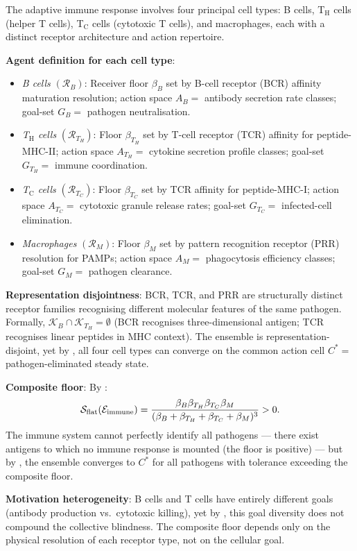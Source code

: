 \begin{example}
\label{ex:immune-response}
The adaptive immune response involves four principal cell types:
B cells, T$_{\mathrm{H}}$ cells (helper T cells), T$_{\mathrm{C}}$ cells
(cytotoxic T cells), and macrophages, each with a distinct receptor
architecture and action repertoire.

\textbf{Agent definition for each cell type}:
\begin{itemize}[leftmargin=2em]
  \item \textit{B cells} $(\mathcal{R}_B)$: Receiver floor $\beta_B$ set by
    B-cell receptor (BCR) affinity maturation resolution; action space $A_B
    =$ antibody secretion rate classes; goal-set $G_B =$ pathogen
    neutralisation.
  \item \textit{T$_{\mathrm{H}}$ cells} $(\mathcal{R}_{T_H})$: Floor $\beta_{T_H}$
    set by T-cell receptor (TCR) affinity for peptide-MHC-II; action space
    $A_{T_H} =$ cytokine secretion profile classes; goal-set $G_{T_H} =$
    immune coordination.
  \item \textit{T$_{\mathrm{C}}$ cells} $(\mathcal{R}_{T_C})$: Floor $\beta_{T_C}$
    set by TCR affinity for peptide-MHC-I; action space $A_{T_C} =$ cytotoxic
    granule release rates; goal-set $G_{T_C} =$ infected-cell elimination.
  \item \textit{Macrophages} $(\mathcal{R}_M)$: Floor $\beta_M$ set by pattern
    recognition receptor (PRR) resolution for PAMPs; action space $A_M =$
    phagocytosis efficiency classes; goal-set $G_M =$ pathogen clearance.
\end{itemize}

\textbf{Representation disjointness}: BCR, TCR, and PRR are structurally
distinct receptor families recognising different molecular features of the
same pathogen.  Formally, $\mathcal{K}_B \cap \mathcal{K}_{T_H} = \emptyset$
(BCR recognises three-dimensional antigen; TCR recognises linear peptides
in MHC context).  The ensemble is representation-disjoint, yet by
, all four cell types can converge on the
common action cell $C^* =$ pathogen-eliminated steady state.

\textbf{Composite floor}:
By :
\[
  \mathcal{S}_{\mathrm{flat}}(\mathcal{E}_{\mathrm{immune}})
  = \frac{\beta_B \beta_{T_H} \beta_{T_C} \beta_M}
         {(\beta_B + \beta_{T_H} + \beta_{T_C} + \beta_M)^3}
  > 0 .
\]
The immune system cannot perfectly identify all pathogens — there exist
antigens to which no immune response is mounted (the floor is positive) — but
by , the ensemble converges to $C^*$ for all
pathogens with tolerance exceeding the composite floor.

\textbf{Motivation heterogeneity}: B cells and T cells have entirely different
goals (antibody production vs.\ cytotoxic killing), yet by
, this goal diversity does not compound the
collective blindness.  The composite floor depends only on the physical
resolution of each receptor type, not on the cellular goal.
\end{example}

